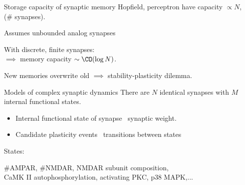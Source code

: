 \documentclass[final]{beamer}%
\begin{document}
\begin{frame}{Storage capacity of synaptic memory}
%
  Hopfield, perceptron have capacity \alert{$\propto N$}, (\# synapses).

\vp\parbox[t]{0.59\linewidth}{%
  Assumes unbounded analog synapses

 \vp With discrete, finite synapses:\\
 $\implies$ memory capacity  \alert{$\sim\CO(\log N)$}.
 \\ 
 }

 \vp New memories overwrite old
 $\implies$ stability-plasticity dilemma.
%
\end{frame}



\begin{frame}{Models of complex synaptic dynamics}
%
  There are $N$ identical synapses with $M$ internal functional states.
%
\parbox[c]{0.82\linewidth}{%
  \begin{itemize}
    \item Internal functional state of synapse \lto\ synaptic weight.
    \item Candidate plasticity events \lto\ transitions between states
  \end{itemize}
}\hfill
{}
%

  \begin{center}
  \end{center}

  States: \parbox[t]{0.85\linewidth}{\#AMPAR, \#NMDAR, NMDAR subunit composition, \\
  CaMK II autophosphorylation, activating PKC, p38 MAPK,...}

  \vp \footnotesize{}%
\end{frame}
\end{document}
